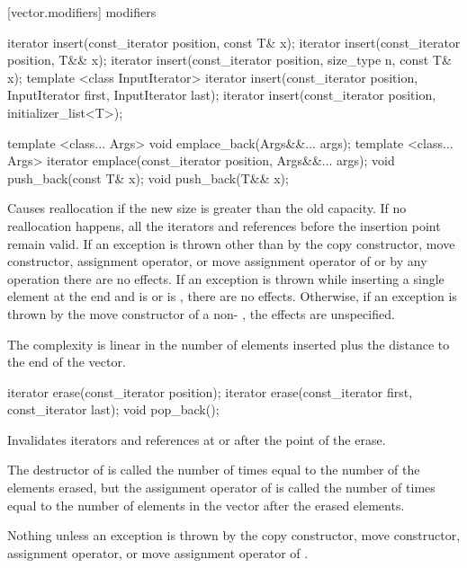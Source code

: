 [vector.modifiers]{ modifiers}

%
\begin{itemdecl}
iterator insert(const_iterator position, const T& x);
iterator insert(const_iterator position, T&& x);
iterator insert(const_iterator position, size_type n, const T& x);
template <class InputIterator>
  iterator insert(const_iterator position, InputIterator first, InputIterator last);
iterator insert(const_iterator position, initializer_list<T>);

template <class... Args> void emplace_back(Args&&... args);
template <class... Args> iterator emplace(const_iterator position, Args&&... args);
void push_back(const T& x);
void push_back(T&& x);
\end{itemdecl}

\begin{itemdescr}
\pnum
\notes
Causes reallocation if the new size is greater than the old capacity.
If no reallocation happens, all the iterators and references before the insertion point remain valid.
If an exception is thrown other than by
the copy constructor, move constructor,
assignment operator, or move assignment operator of
 or by any  operation
there are no effects.
If an exception is thrown while inserting a single element at the end and
 is  or 
is , there are no effects.
Otherwise, if an exception is thrown by the move constructor of a non-
, the effects are unspecified.

\pnum
\complexity
The complexity is linear in the number of elements inserted plus the distance
to the end of the vector.
\end{itemdescr}

%
\begin{itemdecl}
iterator erase(const_iterator position);
iterator erase(const_iterator first, const_iterator last);
void pop_back();
\end{itemdecl}

\begin{itemdescr}
\pnum
\effects
Invalidates iterators and references at or after the point of the erase.

\pnum
\complexity
The destructor of  is called the number of times equal to the
number of the elements erased, but the assignment operator
of  is called the number of times equal to the number of
elements in the vector after the erased elements.

\pnum
\throws
Nothing unless an exception is thrown by the
copy constructor, move constructor,
assignment operator, or move assignment operator of
.
\end{itemdescr}


